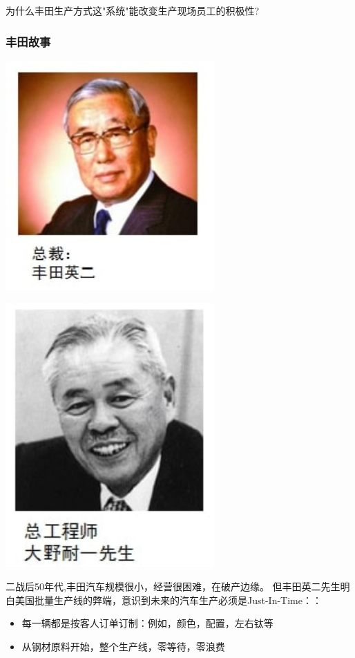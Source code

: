 为什么丰田生产方式这"系统"能改变生产现场员工的积极性?

\hypertarget{ux4e30ux7530ux6545ux4e8b}{%
\subsubsection{丰田故事}\label{ux4e30ux7530ux6545ux4e8b}}


\includegraphics[width=8cm]{丰田总裁.jpg}


\includegraphics[width=8cm]{大野耐一.jpg}

二战后50年代,丰田汽车规模很小，经营很困难，在破产边缘。
但丰田英二先生明白美国批量生产线的弊端，意识到未来的汽车生产必须是Just-In-Time：：

\begin{itemize}
\tightlist
\item
  每一辆都是按客人订单订制：例如，颜色，配置，左右钛等
\item
  从钢材原料开始，整个生产线，零等待，零浪费
\end{itemize}

